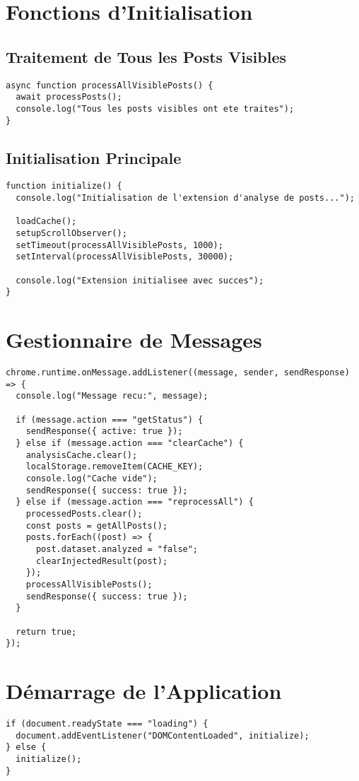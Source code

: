 \documentclass[12pt,a4paper]{article}
\begin{document}
\section{Fonctions d'Initialisation}

\subsection{Traitement de Tous les Posts Visibles}

\begin{lstlisting}
async function processAllVisiblePosts() {
  await processPosts();
  console.log("Tous les posts visibles ont ete traites");
}
\end{lstlisting}

\subsection{Initialisation Principale}

\begin{lstlisting}
function initialize() {
  console.log("Initialisation de l'extension d'analyse de posts...");

  loadCache();
  setupScrollObserver();
  setTimeout(processAllVisiblePosts, 1000);
  setInterval(processAllVisiblePosts, 30000);

  console.log("Extension initialisee avec succes");
}
\end{lstlisting}

\section{Gestionnaire de Messages}

\begin{lstlisting}
chrome.runtime.onMessage.addListener((message, sender, sendResponse) => {
  console.log("Message recu:", message);

  if (message.action === "getStatus") {
    sendResponse({ active: true });
  } else if (message.action === "clearCache") {
    analysisCache.clear();
    localStorage.removeItem(CACHE_KEY);
    console.log("Cache vide");
    sendResponse({ success: true });
  } else if (message.action === "reprocessAll") {
    processedPosts.clear();
    const posts = getAllPosts();
    posts.forEach((post) => {
      post.dataset.analyzed = "false";
      clearInjectedResult(post);
    });
    processAllVisiblePosts();
    sendResponse({ success: true });
  }

  return true;
});
\end{lstlisting}

\section{Démarrage de l'Application}

\begin{lstlisting}
if (document.readyState === "loading") {
  document.addEventListener("DOMContentLoaded", initialize);
} else {
  initialize();
}
\end{lstlisting}
\end{document}
